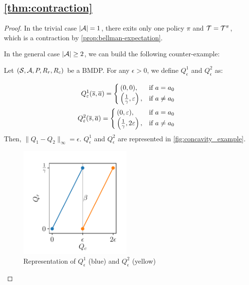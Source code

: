 \subsection{\autoref{thm:contraction}}
\label{sec:proof_contraction}
\begin{proof}
In the trivial case $|\mathcal{A}| = 1$, there exits only one policy $\pi$ and $\mathcal{T} = \mathcal{T}^\pi$, which is a contraction by \autoref{prop:bellman-expectation}.

In the general case $|\mathcal{A}| \geq 2$, we can build the following counter-example:

Let $(\mathcal{S}, \mathcal{A}, P, R_r, R_c)$ be a BMDP.
For any $\epsilon > 0$, we define $Q_\epsilon^1$ and $Q_\epsilon^2$ as:

\begin{align*}
      Q_\varepsilon^1(\overline{s},\overline{a}) =
      \begin{cases}
    (0, 0), & \text{if } a = a_0 \\
    \left(\frac{1}{\gamma}, \varepsilon\right), & \text{if } a \neq a_0
  \end{cases}\\
  Q_\varepsilon^2(\overline{s},\overline{a}) =
      \begin{cases}
    (0, \varepsilon), & \text{if } a = a_0 \\
    \left(\frac{1}{\gamma}, 2\varepsilon\right), & \text{if } a \neq a_0
  \end{cases}
\end{align*}
Then, $\|Q_1-Q_2\|_\infty = \epsilon$.
 $Q_\epsilon^1$ and $Q_\epsilon^2$ are represented in \autoref{fig:concavity_example}.

\begin{figure}[tp]
    \centering
    \includegraphics[width=0.5\textwidth]{2-Chapters/5-Chapter/img/concavity_example.pdf}
    \caption{Representation of $Q_\epsilon^1$ (blue) and $Q_\epsilon^2$ (yellow)}
    \label{fig:concavity_example}
\end{figure}


\end{proof}
